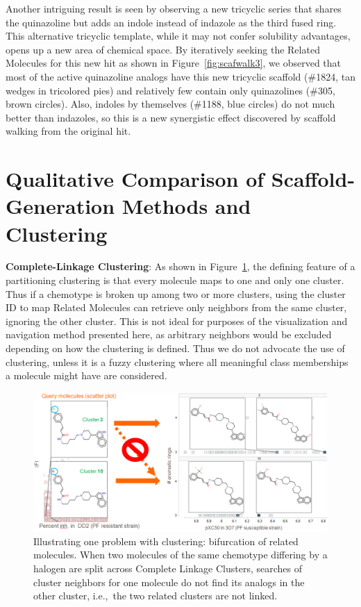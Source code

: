 \documentclass[11pt,letterpaper]{article}
\newcommand*\fref[1]{Figure~\ref{fig:#1}}
\newcommand*\ie{i.e.,~}
\begin{document}
Another intriguing result is seen by observing a new tricyclic series that shares the quinazoline but adds an indole instead of indazole as the third fused ring. This alternative tricyclic template, while it may not confer solubility advantages, opens up a new area of chemical space. By iteratively seeking the Related Molecules for this new hit as shown in \fref{scafwalk3}, we observed that most of the active quinazoline analogs have this new tricyclic scaffold (\#1824, tan wedges in tricolored pies) and relatively few contain only quinazolines (\#305, brown circles). Also, indoles by themselves (\#1188, blue circles) do not much better than indazoles, so this is a new synergistic effect discovered by scaffold walking from the original hit.            


\newpage 

\section{Qualitative Comparison of Scaffold-Generation Methods and Clustering}\label{sec:qualcomp}
{\bf Complete-Linkage Clustering}: As shown in \fref{clusterlanes}, the defining feature of a partitioning clustering is that every molecule maps to one and only one cluster. Thus if a chemotype is broken up among two or more clusters, using the cluster ID to map Related Molecules can retrieve only neighbors from the same cluster, ignoring the other cluster. This is not ideal for purposes of the visualization and navigation method presented here, as arbitrary neighbors would be excluded depending on how the clustering is defined.  Thus we do not advocate the use of clustering, unless it is a fuzzy clustering where all meaningful class memberships a molecule might have are considered. 

\begin{figure}
\includegraphics[width=6in]{../fig/clusterlanes.png}
\caption{Illustrating one problem with clustering: bifurcation of related molecules.  When two molecules of the same chemotype differing by a halogen are split across Complete Linkage Clusters, searches of cluster neighbors for one molecule do not find its analogs in the other cluster, \ie the two related clusters are not linked.}
\label{fig:clusterlanes}
\end{figure}
\end{document}
